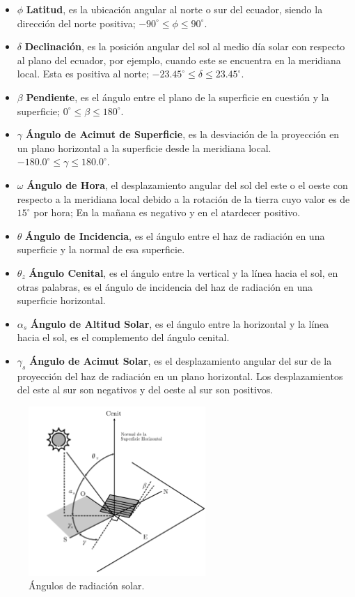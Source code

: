 \begin{itemize}
	\item $\phi$ \textbf{Latitud}, es la ubicación angular al norte o sur del ecuador, siendo la dirección del norte positiva; $-90^\circ\leq\phi\leq90^\circ$.
	\item $\delta$ \textbf{Declinación}, es la posición angular del sol al medio día solar con respecto al plano del ecuador, por ejemplo, cuando este se encuentra en la meridiana local. Esta es positiva al norte; $-23.45^\circ\leq\delta\leq23.45^\circ$.
	\item $\beta$ \textbf{Pendiente}, es el ángulo entre el plano de la superficie en cuestión y la superficie; $0^\circ\leq\beta\leq180^\circ$.
	\item $\gamma$ \textbf{Ángulo de Acimut de Superficie}, es la desviación de la proyección en un plano horizontal a la superficie desde la meridiana local. $-180.0^\circ\leq\gamma\leq180.0^\circ$.
	\item $\omega$ \textbf{Ángulo de Hora}, el desplazamiento angular del sol del este o el oeste con respecto a la meridiana local debido a la rotación de la tierra cuyo valor es de $15^\circ$ por hora; En la mañana es negativo y en el atardecer positivo.
	\item $\theta$ \textbf{Ángulo de Incidencia}, es el ángulo entre el haz de radiación en una superficie y la normal de esa superficie.
	\item $\theta_z$ \textbf{Ángulo Cenital}, es el ángulo entre la vertical y la línea hacia el sol, en otras palabras, es el ángulo de incidencia del haz de radiación en una superficie horizontal.
	\item $\alpha_s$ \textbf{Ángulo de Altitud Solar}, es el ángulo entre la horizontal y la línea hacia el sol, es el complemento del ángulo cenital.
	\item $\gamma_s$ \textbf{Ángulo de Acimut Solar}, es el desplazamiento angular del sur de la proyección del haz de radiación en un plano horizontal. Los desplazamientos del este al sur son negativos y del oeste al sur son positivos.	
\end{itemize}

\begin{figure}[htbp]
	\centering
	\includegraphics[width=0.6\textwidth, angle=0]{images/solarradiationdirectionangles.pdf}
	\caption{Ángulos de radiación solar.}
\end{figure}

